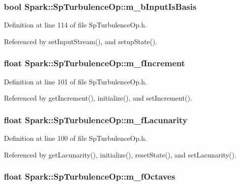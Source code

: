 \subsubsection{\setlength{\rightskip}{0pt plus 5cm}bool {\bf Spark::Sp\-Turbulence\-Op::m\_\-b\-Input\-Is\-Basis}\hspace{0.3cm}{\tt  [protected]}}\label{classSpark_1_1SpTurbulenceOp_p11}


Definition at line 114 of file Sp\-Turbulence\-Op.h.

Referenced by set\-Input\-Stream(), and setup\-State().
\subsubsection{\setlength{\rightskip}{0pt plus 5cm}float {\bf Spark::Sp\-Turbulence\-Op::m\_\-f\-Increment}\hspace{0.3cm}{\tt  [protected]}}\label{classSpark_1_1SpTurbulenceOp_p2}


Definition at line 101 of file Sp\-Turbulence\-Op.h.

Referenced by get\-Increment(), initialize(), and set\-Increment().
\subsubsection{\setlength{\rightskip}{0pt plus 5cm}float {\bf Spark::Sp\-Turbulence\-Op::m\_\-f\-Lacunarity}\hspace{0.3cm}{\tt  [protected]}}\label{classSpark_1_1SpTurbulenceOp_p1}


Definition at line 100 of file Sp\-Turbulence\-Op.h.

Referenced by get\-Lacunarity(), initialize(), reset\-State(), and set\-Lacunarity().
\subsubsection{\setlength{\rightskip}{0pt plus 5cm}float {\bf Spark::Sp\-Turbulence\-Op::m\_\-f\-Octaves}\hspace{0.3cm}{\tt  [protected]}}\label{classSpark_1_1SpTurbulenceOp_p0}


